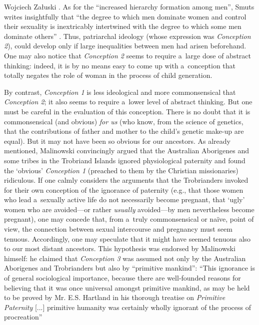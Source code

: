 \begin{artengenv}{Wojciech Załuski}
\parencite[][p.16]{smuts_evolutionary_1995}. %
 As for the ``increased hierarchy formation among men'', Smuts writes insightfully that ``the degree to which men dominate women and control their sexuality is inextricably intertwined with the degree to which some men dominate others'' 
\parencite[][p.18]{smuts_evolutionary_1995}. %
 Thus, patriarchal ideology (whose expression was \textit{Conception 2}), could develop only if large inequalities between men had arisen beforehand. One may also notice that \textit{Conception 2} seems to require a~large dose of abstract thinking: indeed, it is by no means easy to come up with a~conception that totally negates the role of woman in the process of child generation.

By contrast, \textit{Conception 1} is less ideological and more commonsensical that \textit{Conception 2}; it also seems to require a~lower level of abstract thinking. But one must be careful in the evaluation of this conception. There is no doubt that it is commonsensical (and obvious) \textit{for us} (who know, from the science of genetics, that the contributions of father and mother to the child's genetic make-up are equal). But it may not have been so obvious for our ancestors. As already mentioned, Malinowski convincingly argued that the Australian Aborigenes and some tribes in the Trobriand Islands ignored physiological paternity and found the ‘obvious' \textit{Conception 1} (preached to them by the Christian missionaries) ridiculous. If one calmly considers the arguments that the Trobrianders invoked for their own conception of the ignorance of paternity (e.g., that those women who lead a~sexually active life do not necessarily become pregnant, that ‘ugly' women who are avoided---or rather \textit{usually} avoided---by men nevertheless become pregnant), one may concede that, from a~truly commonsensical or naïve, point of view, the connection between sexual intercourse and pregnancy must seem tenuous. Accordingly, one may speculate that it might have seemed tenuous also to our most distant ancestors. This hypothesis was endorsed by Malinowski himself: he claimed that \textit{Conception 3} was assumed not only by the Australian Aborigenes and Trobrianders but also by ``primitive mankind'': ``This ignorance is of general sociological importance, because there are well-founded reasons for believing that it was once universal amongst primitive mankind, as may be held to be proved by Mr. E.S. Hartland in his thorough treatise on \textit{Primitive Paternity} [...] primitive humanity was certainly wholly ignorant of the process of procreation''

\end{artengenv}
